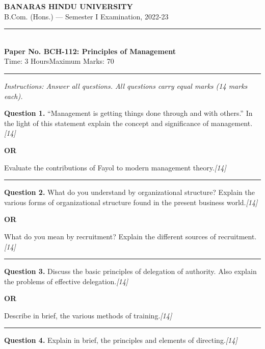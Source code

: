 \documentclass[11pt,a4paper]{article}
\newcommand{\pts}[1]{\hfill   \textit{[#1]}}
\begin{document}
\begin{center}
  {\large\bfseries BANARAS HINDU UNIVERSITY}\\[2pt]
  {\normalsize B.Com. (Hons.) --- Semester I Examination, 2022-23}\\[6pt]
  \rule{0.8\linewidth}{0.5pt}\\[6pt]
  {\large\bfseries Paper No. BCH-112: Principles of Management}\\[4pt]
  {\normalsize Time: 3 Hours\hfill Maximum Marks: 70}
\end{center}

\rule{\linewidth}{0.4pt}

\smallskip



\noindent   \textit{Instructions: Answer all questions. All questions carry equal marks (14 marks each).}

\bigskip




\noindent   \textbf{Question 1.}
``Management is getting things done through and with others.'' In the light of this statement explain the concept and significance of management.\pts{14}

\centerline{   \textbf{OR}}

Evaluate the contributions of Fayol to modern management theory.\pts{14}

\medskip\rule{\linewidth}{0.2pt}




\noindent   \textbf{Question 2.}
What do you understand by organizational structure? Explain the various forms of organizational structure found in the present business world.\pts{14}

\centerline{   \textbf{OR}}

What do you mean by recruitment? Explain the different sources of recruitment.\pts{14}

\medskip\rule{\linewidth}{0.2pt}




\noindent   \textbf{Question 3.}
Discuss the basic principles of delegation of authority. Also explain the problems of effective delegation.\pts{14}

\centerline{   \textbf{OR}}

Describe in brief, the various methods of training.\pts{14}

\medskip\rule{\linewidth}{0.2pt}




\noindent   \textbf{Question 4.}
Explain in brief, the principles and elements of directing.\pts{14}
\end{document}
